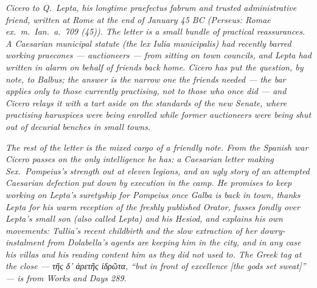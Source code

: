 
\textit{Cicero to Q.~Lepta, his longtime praefectus fabrum and
trusted administrative friend, written at Rome at the end of
January 45 BC (Perseus: \textit{Romae ex.~m.~Ian.~a.~709 (45)}).
The letter is a small bundle of practical reassurances. A
Caesarian municipal statute (the \textit{lex Iulia
municipalis}) had recently barred working \textit{praecones}
--- auctioneers --- from sitting on town councils, and Lepta
had written in alarm on behalf of friends back home. Cicero
has put the question, by note, to Balbus; the answer is the
narrow one the friends needed --- the bar applies only to those
currently practising, not to those who once did --- and Cicero
relays it with a tart aside on the standards of the new Senate,
where practising \textit{haruspices} were being enrolled while
former auctioneers were being shut out of decurial benches in
small towns.}

\textit{The rest of the letter is the mixed cargo of a friendly
note. From the Spanish war Cicero passes on the only intelligence
he has: a Caesarian letter making Sex.~Pompeius's strength out at
eleven legions, and an ugly story of an attempted Caesarian
defection put down by execution in the camp. He promises to keep
working on Lepta's suretyship for Pompeius once Galba is back in
town, thanks Lepta for his warm reception of the freshly published
\textit{Orator}, fusses fondly over Lepta's small son (also
called Lepta) and his Hesiod, and explains his own movements:
Tullia's recent childbirth and the slow extraction of her
dowry-instalment from Dolabella's agents are keeping him in the
city, and in any case his villas and his reading content him as
they did not used to. The Greek tag at the close ---
\textgreek{τῆς δ’ ἀρετῆς ἱδρῶτα}, ``but in front of excellence
[the gods set sweat]'' --- is from \textit{Works and Days} 289.}

